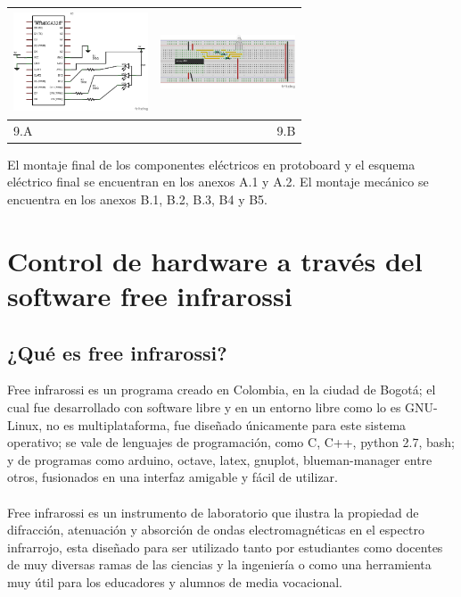 \documentclass[12]{article}
\newenvironment{Figure}
{\par\medskip\noindent\minipage{\linewidth}}
{\endminipage\par\medskip}
\begin{document}
\begin{multicols}{2}
\begin{Figure}	
\center
\begin{tabular}{|l|r|}
\hline
\includegraphics[width=4cm, height=3cm]{img/rgbesq.png} & \includegraphics[width=4cm, height=3cm]{img/rgbmont.png} \\ \hline
9.A & 9.B \\ \hline
\end{tabular}
\label{fig:g9}
\end{Figure}
\vspace{0.6 cm}

El montaje final de los componentes eléctricos en protoboard y el esquema eléctrico final se encuentran en los anexos A.1 y A.2.
El montaje mecánico se encuentra en los anexos B.1, B.2,  B.3, B4 y B5.

\section{Control de hardware a través del software free infrarossi}

\subsection{¿Qué es free infrarossi?}
Free infrarossi es un  programa creado en Colombia, en la ciudad de Bogotá; el cual fue desarrollado con software libre y en un entorno libre como lo es GNU-Linux, no es multiplataforma, fue diseñado únicamente para este sistema operativo; se vale de lenguajes de programación, como  C, C++, python 2.7, bash; y de programas como arduino, octave, latex, gnuplot, blueman-manager entre otros, fusionados en una interfaz amigable y fácil de utilizar. \\\\
Free infrarossi es un instrumento de laboratorio que ilustra  la propiedad de difracción, atenuación y absorción de ondas electromagnéticas en el espectro infrarrojo, esta diseñado para ser utilizado tanto por  estudiantes como docentes de muy diversas ramas de las ciencias y  la ingeniería o como una herramienta muy útil para los educadores y alumnos de media vocacional.


\end{multicols}
\end{document}
